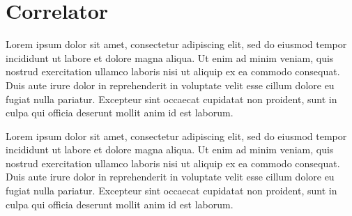 \documentclass[11pt,letterpaper]{article}
\begin{document}
\begin{figure}[h]
\centering
\caption{} \label{fig:addinterferometer}
\end{figure}


\section{Correlator}

Lorem ipsum dolor sit amet, consectetur adipiscing elit, sed do eiusmod tempor incididunt ut labore et dolore magna aliqua. Ut enim ad minim veniam, quis nostrud exercitation ullamco laboris nisi ut aliquip ex ea commodo consequat. Duis aute irure dolor in reprehenderit in voluptate velit esse cillum dolore eu fugiat nulla pariatur. Excepteur sint occaecat cupidatat non proident, sunt in culpa qui officia deserunt mollit anim id est laborum.

Lorem ipsum dolor sit amet, consectetur adipiscing elit, sed do eiusmod tempor incididunt ut labore et dolore magna aliqua. Ut enim ad minim veniam, quis nostrud exercitation ullamco laboris nisi ut aliquip ex ea commodo consequat. Duis aute irure dolor in reprehenderit in voluptate velit esse cillum dolore eu fugiat nulla pariatur. Excepteur sint occaecat cupidatat non proident, sunt in culpa qui officia deserunt mollit anim id est laborum.
\end{document}
